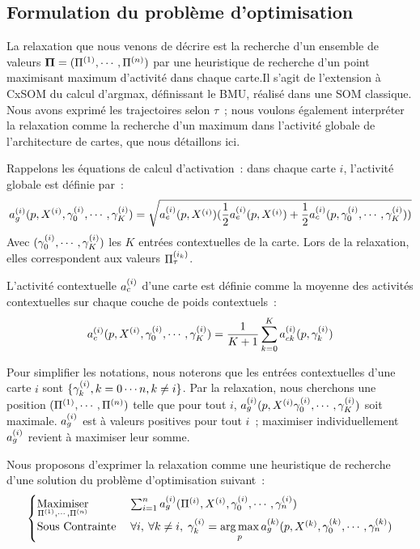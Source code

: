 \documentclass[../main]{subfiles}
\begin{document}
\subsection{Formulation du problème d'optimisation}\label{sec:formulation_argmax}

La relaxation que nous venons de décrire est la recherche d'un ensemble de valeurs $\mathbf{\Pi} = (\Pi^{({1})}, \cdots, \Pi^{({n})})$ par une heuristique de recherche d'un point maximisant maximum d'activité dans chaque carte.Il s'agit de l'extension à CxSOM du calcul d'argmax, définissant le BMU, réalisé dans une SOM classique. 
Nous avons exprimé les trajectoires selon $\tau$~; nous voulons également interpréter la relaxation comme la recherche d'un maximum dans l'activité globale de l'architecture de cartes, que nous détaillons ici. 

Rappelons les équations de calcul d'activation~:
dans chaque carte $i$, l'activité globale est définie par~:
\begin{equation}\label{eq:ag}
	a_g^{({i})}(p, X^{({i})}, \gamma^{({i})}_0, \cdots, \gamma^{({i})}_K) = \sqrt{a_e^{({i})}(p,X^{({i})})(\frac{1}{2}a_e^{({i})}(p,X^{({i})}) + \frac{1}{2}a_c^{({i})}(p,\gamma^{({i})}_0, \cdots, \gamma^{({i})}_K))}
\end{equation}
Avec $(\gamma^{({i})}_0, \cdots, \gamma^{({i})}_K)$ les $K$ entrées contextuelles de la carte. Lors de la relaxation, elles correspondent aux valeurs $\Pi^{({i_k})}_\tau$.

L'activité contextuelle $a_c^{({i})}$ d'une carte est définie comme la moyenne des activités contextuelles sur chaque couche de poids contextuels~:
\begin{equation}
	a_c^{({i})}(p,  X^{({i})}, \gamma^{({i})}_0, \cdots, \gamma^{({i})}_K) = \frac{1}{K+1}\sum_{k=0}^{K}{a_{ck}^{({i})}(p, \gamma^{({i})}_k)}
\end{equation}

Pour simplifier les notations, nous noterons que les entrées contextuelles d'une carte $i$ sont $\{ \gamma^{({i})}_k, k = 0 \cdots n , k \neq i  \}$.
Par la relaxation, nous cherchons une position $(\Pi^{({1})}, \cdots, \Pi^{({n})})$ telle que pour tout $i$, $a_g^{({i})}(p,  X^{({i})} \gamma^{({i})}_0, \cdots, \gamma^{({i})}_K)$ soit maximale. $a_g^{({i})}$ est à valeurs positives pour tout $i$~; maximiser individuellement $a_g^{({i})}$ revient à maximiser leur somme.

Nous proposons d'exprimer la relaxation comme une heuristique de recherche d'une solution du problème d'optimisation suivant~:
\begin{equation}\label{eq:opti}
	\begin{cases}
	\operatorname*{Maximiser}\limits_{\Pi^{({1})}, \cdots, \Pi^{({n})}}\;& \sum_{i = 1}^n a_g^{({i})}(\Pi^{({i})},X^{({i})},\gamma_0^{({i})}, \cdots, \gamma_n^{({i})}) \\
	\text{Sous Contrainte}\; &\forall i,\:\forall k \neq i, \; \gamma_k^{({i})} = \operatorname*{arg\,max}\limits_p a_g^{({k})}(p, X^{({k})}, \gamma_0^{({k})}, \cdots, \gamma_n^{({k})})
	\end{cases}
\end{equation}
\end{document}
